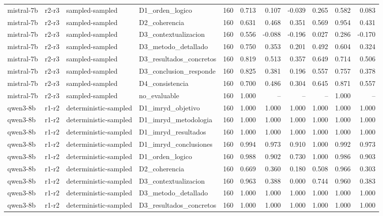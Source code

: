 \begin{table}
\begin{tabular}{llllrrrrrrr}
mistral-7b & r2-r3 & sampled-sampled & D1\_orden\_logico & 160 & 0.713 & 0.107 & -0.039 & 0.265 & 0.582 & 0.083 \\
mistral-7b & r2-r3 & sampled-sampled & D2\_coherencia & 160 & 0.631 & 0.468 & 0.351 & 0.569 & 0.954 & 0.431 \\
mistral-7b & r2-r3 & sampled-sampled & D3\_contextualizacion & 160 & 0.556 & -0.088 & -0.196 & 0.027 & 0.286 & -0.170 \\
mistral-7b & r2-r3 & sampled-sampled & D3\_metodo\_detallado & 160 & 0.750 & 0.353 & 0.201 & 0.492 & 0.604 & 0.324 \\
mistral-7b & r2-r3 & sampled-sampled & D3\_resultados\_concretos & 160 & 0.819 & 0.513 & 0.357 & 0.649 & 0.714 & 0.506 \\
mistral-7b & r2-r3 & sampled-sampled & D3\_conclusion\_responde & 160 & 0.825 & 0.381 & 0.196 & 0.557 & 0.757 & 0.378 \\
mistral-7b & r2-r3 & sampled-sampled & D4\_consistencia & 160 & 0.700 & 0.486 & 0.304 & 0.645 & 0.871 & 0.557 \\
mistral-7b & r2-r3 & sampled-sampled & no\_evaluable & 160 & 1.000 & -- & -- & -- & 1.000 & -- \\
qwen3-8b & r1-r2 & deterministic-sampled & D1\_imryd\_objetivo & 160 & 1.000 & 1.000 & 1.000 & 1.000 & 1.000 & 1.000 \\
qwen3-8b & r1-r2 & deterministic-sampled & D1\_imryd\_metodologia & 160 & 1.000 & 1.000 & 1.000 & 1.000 & 1.000 & 1.000 \\
qwen3-8b & r1-r2 & deterministic-sampled & D1\_imryd\_resultados & 160 & 1.000 & 1.000 & 1.000 & 1.000 & 1.000 & 1.000 \\
qwen3-8b & r1-r2 & deterministic-sampled & D1\_imryd\_conclusiones & 160 & 0.994 & 0.973 & 0.910 & 1.000 & 0.992 & 0.973 \\
qwen3-8b & r1-r2 & deterministic-sampled & D1\_orden\_logico & 160 & 0.988 & 0.902 & 0.730 & 1.000 & 0.986 & 0.903 \\
qwen3-8b & r1-r2 & deterministic-sampled & D2\_coherencia & 160 & 0.669 & 0.360 & 0.180 & 0.508 & 0.966 & 0.303 \\
qwen3-8b & r1-r2 & deterministic-sampled & D3\_contextualizacion & 160 & 0.963 & 0.388 & 0.000 & 0.744 & 0.960 & 0.383 \\
qwen3-8b & r1-r2 & deterministic-sampled & D3\_metodo\_detallado & 160 & 1.000 & 1.000 & 1.000 & 1.000 & 1.000 & 1.000 \\
qwen3-8b & r1-r2 & deterministic-sampled & D3\_resultados\_concretos & 160 & 1.000 & 1.000 & 1.000 & 1.000 & 1.000 & 1.000 \\

\end{tabular}
\end{table}

